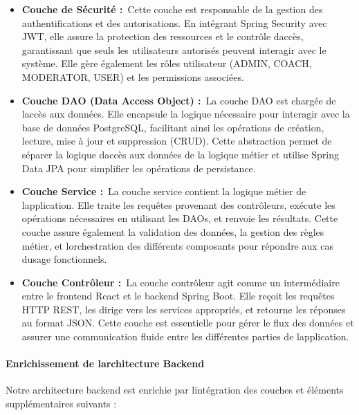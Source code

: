 \documentclass[12pt,a4paper,twoside]{report}
\begin{document}
\begin{itemize}
\item
  \textbf{Couche de Sécurité :}~Cette couche est responsable de la
  gestion des authentifications et des autorisations. En intégrant
  Spring Security avec JWT, elle assure la protection des ressources et
  le contrôle d\textquotesingle accès, garantissant que seuls les
  utilisateurs autorisés peuvent interagir avec le système. Elle gère
  également les rôles utilisateur (ADMIN, COACH, MODERATOR, USER) et les
  permissions associées.
\item
  \textbf{Couche DAO (Data Access Object) :}~La couche DAO est chargée
  de l\textquotesingle accès aux données. Elle encapsule la logique
  nécessaire pour interagir avec la base de données PostgreSQL,
  facilitant ainsi les opérations de création, lecture, mise à jour et
  suppression (CRUD). Cette abstraction permet de séparer la logique
  d\textquotesingle accès aux données de la logique métier et utilise
  Spring Data JPA pour simplifier les opérations de persistance.
\item
  \textbf{Couche Service :}~La couche service contient la logique métier
  de l\textquotesingle application. Elle traite les requêtes provenant
  des contrôleurs, exécute les opérations nécessaires en utilisant les
  DAOs, et renvoie les résultats. Cette couche assure également la
  validation des données, la gestion des règles métier, et
  l\textquotesingle orchestration des différents composants pour
  répondre aux cas d\textquotesingle usage fonctionnels.
\item
  \textbf{Couche Contrôleur :}~La couche contrôleur agit comme un
  intermédiaire entre le frontend React et le backend Spring Boot. Elle
  reçoit les requêtes HTTP REST, les dirige vers les services
  appropriés, et retourne les réponses au format JSON. Cette couche est
  essentielle pour gérer le flux des données et assurer une
  communication fluide entre les différentes parties de
  l\textquotesingle application.
\end{itemize}

\hypertarget{enrichissement-de-larchitecture-backend}{%
\paragraph{Enrichissement de l\textquotesingle architecture
Backend}\label{enrichissement-de-larchitecture-backend}}

Notre architecture backend est enrichie par
l\textquotesingle intégration des couches et éléments supplémentaires
suivants :
\end{document}
